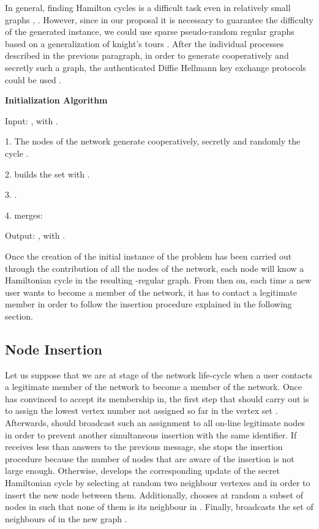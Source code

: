 \documentclass{article}
\begin{document}
In general, finding Hamilton cycles is a difficult task even in relatively small graphs \cite{Van98}, \cite{Shi04}. However, since in our proposal it is necessary to guarantee the difficulty of the generated instance,  we could use sparse pseudo-random regular graphs based on a generalization of knight's tours \cite{KS02}. After the individual processes described in the previous paragraph, in order to generate cooperatively and secretly such a graph, the authenticated Diffie Hellmann key exchange protocols could be used \cite{DVW92}.  

{\bf Initialization Algorithm}

Input: , with .

1. The   nodes of the network generate cooperatively, secretly and randomly the cycle .

2.  builds the set  with .

3. .

4.  merges: 

Output:  , with .

Once the creation of the initial instance of the problem has
been carried out through the contribution of all the nodes
of the network, each node will know a Hamiltonian
cycle in the resulting -regular graph. From then on,
each time a new user  wants to become a member of the network,
it has to contact a legitimate member  in order to follow the
insertion procedure explained in the following section.

\subsection{Node Insertion}


Let us suppose that we are at  stage  of the network life-cycle
when a user  contacts a legitimate member  of the network to
become a member of the network. Once  has convinced  to
accept its membership in, the first step that  should
carry out is to assign  the lowest vertex number  not assigned
so far in the vertex set . Afterwards,  should
broadcast such an assignment to all on-line legitimate nodes in order to prevent another simultaneous insertion with the same identifier. If  receives
less than  answers to the previous message, she stops the insertion procedure because
the number of nodes that are aware of the insertion is not large
enough. Otherwise,  develops the corresponding update of the
secret Hamiltonian cycle  by selecting at random two
neighbour vertexes  and  in order to insert the new node
 between them. Additionally,  chooses at random a subset of 
nodes in  such that none of them is its neighbour in . Finally,  broadcasts the set of neighbours  of  in
the new graph  .
\end{document}
